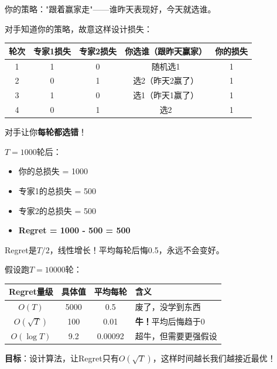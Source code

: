 \documentclass[11pt,a4paper]{article}
\theoremstyle{definition}
\begin{document}
\begin{calculation}[被对手坑惨的例子]
你的策略："跟着赢家走"——谁昨天表现好，今天就选谁。

对手知道你的策略，故意这样设计损失：

\begin{center}
\begin{tabular}{c|cc|c|c}
\toprule
轮次 & 专家1损失 & 专家2损失 & 你选谁（跟昨天赢家） & 你的损失 \\
\midrule
1 & 1 & 0 & 随机选1 & 1 \\
2 & 0 & 1 & 选2（昨天2赢了） & 1 \\
3 & 1 & 0 & 选1（昨天1赢了） & 1 \\
4 & 0 & 1 & 选2 & 1 \\
\bottomrule
\end{tabular}
\end{center}

对手让你\textbf{每轮都选错}！

$T=1000$轮后：
\begin{itemize}
    \item 你的总损失 = 1000
    \item 专家1的总损失 = 500
    \item 专家2的总损失 = 500
    \item \textbf{Regret = 1000 - 500 = 500}
\end{itemize}

Regret是$T/2$，线性增长！平均每轮后悔0.5，永远不会变好。
\end{calculation}

\begin{keypoint}[Regret的量级意味着什么]
假设跑$T = 10000$轮：

\begin{center}
\begin{tabular}{c|c|c|l}
\toprule
Regret量级 & 具体值 & 平均每轮 & 含义 \\
\midrule
$O(T)$ & 5000 & 0.5 & 废了，没学到东西 \\
$O(\sqrt{T})$ & 100 & 0.01 & \textbf{牛！}平均后悔趋于0 \\
$O(\log T)$ & 9.2 & 0.00092 & 超牛，但需要更强假设 \\
\bottomrule
\end{tabular}
\end{center}

\textbf{目标}：设计算法，让Regret只有$O(\sqrt{T})$，这样时间越长我们越接近最优！
\end{keypoint}

\end{document}
